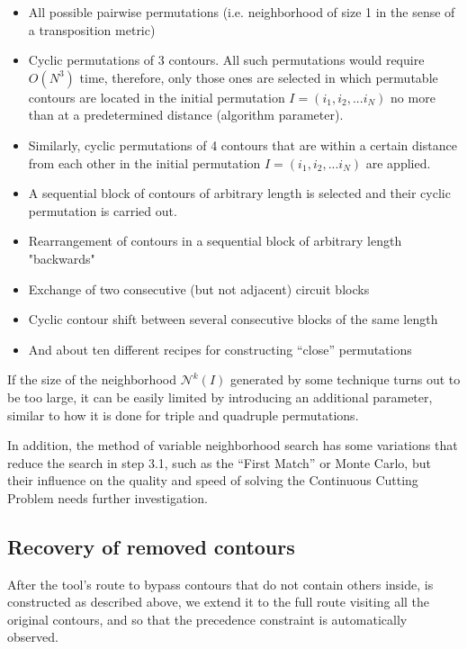 \documentclass[]{interact}
\theoremstyle{plain}%
\theoremstyle{definition}
\theoremstyle{remark}
\begin{document}
\begin{itemize}
  \item All possible pairwise permutations
  (i.e. neighborhood of size 1 in the sense of a transposition metric)
  \item
  Cyclic permutations of 3 contours.
  All such permutations would require
  $O (N ^ 3)$ time,
  therefore, only those ones are selected
  in which permutable contours are located
  in the initial permutation
  $I = (i_1, i_2, ... i_N)$
  no more than at a predetermined distance
  (algorithm parameter).
  \item
  Similarly,
  cyclic permutations of 4 contours
  that are within a certain distance from each other
  in the initial permutation
  $I = (i_1, i_2, ... i_N)$
  are applied.
  \item
  A sequential block of contours
  of arbitrary length is selected
  and their cyclic permutation is carried out.
  \item
  Rearrangement of contours in a sequential block
  of arbitrary length "backwards"
  \item
  Exchange of two consecutive
  (but not adjacent)
  circuit blocks
  \item
  Cyclic contour shift between
  several consecutive blocks of the same length
  \item
  And about ten different recipes for constructing ``close'' permutations
\end{itemize}

If the size of the neighborhood
$\mathcal N^k(I)$
generated by some technique
turns out to be too large,
it can be easily limited by
introducing an additional parameter,
similar to how it is done for
triple and quadruple permutations.

In addition,
the method of variable neighborhood search
has some variations that reduce
the search in step 3.1,
such as the ``First Match''
or Monte Carlo,
but their influence on the quality and speed of
solving the Continuous Cutting Problem
needs further investigation.

\subsection{Recovery of removed contours}

After the tool’s route
to bypass contours
that do not contain others inside,
is constructed as described above,
we extend it to the full route
visiting all the original contours,
and so that the precedence constraint is
automatically
observed.
\end{document}
